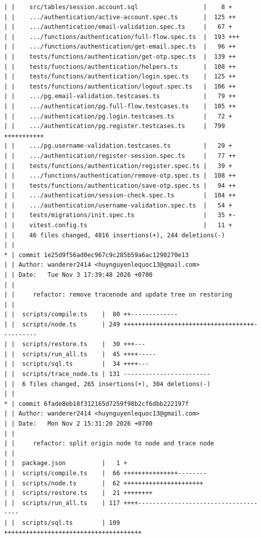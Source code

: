 \documentclass[12pt]{article}
\begin{document}
\begin{lstlisting}[numbers=none,breaklines=true]
| |    src/tables/session.account.sql                  |    8 +
| |    .../authentication/active-account.spec.ts       |  125 ++
| |    .../authentication/email-validation.spec.ts     |   67 +
| |    .../functions/authentication/full-flow.spec.ts  |  193 +++
| |    .../functions/authentication/get-email.spec.ts  |   96 ++
| |    tests/functions/authentication/get-otp.spec.ts  |  139 ++
| |    tests/functions/authentication/helpers.ts       |  108 ++
| |    tests/functions/authentication/login.spec.ts    |  125 ++
| |    tests/functions/authentication/logout.spec.ts   |  106 ++
| |    .../pg.email-validation.testcases.ts            |   79 ++
| |    .../authentication/pg.full-flow.testcases.ts    |  105 ++
| |    .../authentication/pg.login.testcases.ts        |   72 +
| |    .../authentication/pg.register.testcases.ts     |  799 +++++++++++
| |    .../pg.username-validation.testcases.ts         |   29 +
| |    .../authentication/register-session.spec.ts     |   77 ++
| |    tests/functions/authentication/register.spec.ts |   39 +
| |    .../functions/authentication/remove-otp.spec.ts |  108 ++
| |    tests/functions/authentication/save-otp.spec.ts |   94 ++
| |    .../authentication/session-check.spec.ts        |  104 ++
| |    .../authentication/username-validation.spec.ts  |   54 +
| |    tests/migrations/init.spec.ts                   |   35 +-
| |    vitest.config.ts                                |   11 +
| |    46 files changed, 4816 insertions(+), 244 deletions(-)
| |
* | commit 1e25d9f56ad0ec967c9c285b59a6ac1290270e13
| | Author: wanderer2414 <huynguyenlequoc13@gmail.com>
| | Date:   Tue Nov 3 17:39:48 2026 +0700
| |
| |     refactor: remove tracenode and update tree on restoring
| |
| |  scripts/compile.ts    |  80 ++-------------
| |  scripts/node.ts       | 249 ++++++++++++++++++++++++++++++++++++----------
| |  scripts/restore.ts    |  30 +++---
| |  scripts/run_all.ts    |  45 ++++-----
| |  scripts/sql.ts        |  34 ++++---
| |  scripts/trace_node.ts | 131 ------------------------
| |  6 files changed, 265 insertions(+), 304 deletions(-)
| |
* | commit 6fade8eb18f312165d7259f98b2cf6dbb222197f
| | Author: wanderer2414 <huynguyenlequoc13@gmail.com>
| | Date:   Mon Nov 2 15:31:20 2026 +0700
| |
| |     refactor: split origin node to node and trace node
| |
| |  package.json          |   1 +
| |  scripts/compile.ts    |  66 +++++++++++++++--------
| |  scripts/node.ts       |  62 ++++++++++++++++++++++
| |  scripts/restore.ts    |  21 ++++++++
| |  scripts/run_all.ts    | 117 ++++-------------------------------------
| |  scripts/sql.ts        | 109 ++++++++++++++++++++++++++++++++++++++

\end{lstlisting}
\end{document}

